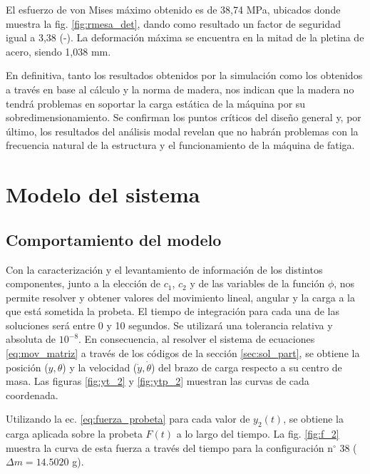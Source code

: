 El esfuerzo de von Mises máximo obtenido es de 38,74 MPa, ubicados donde muestra la fig. \ref{fig:rmesa_det}, dando como resultado un factor de seguridad igual a 3,38 (-). La deformación máxima se encuentra en la mitad de la pletina de acero, siendo 1,038 mm.

En definitiva, tanto los resultados obtenidos por la simulación como los obtenidos a través en base al cálculo y la norma de madera, nos indican que la madera no tendrá problemas en soportar la carga estática de la máquina por su sobredimensionamiento. Se confirman los puntos críticos del diseño general y, por último, los resultados del análisis modal revelan que no habrán problemas con la frecuencia natural de la estructura y el funcionamiento de la máquina de fatiga.

\section{Modelo del sistema}

\subsection{Comportamiento del modelo}
Con la caracterización y el levantamiento de información de los distintos componentes, junto a la elección de $c_1$, $c_2$ y de las variables de la función $\phi$, nos permite resolver y obtener valores del movimiento lineal, angular y la carga a la que está sometida la probeta. El tiempo de integración para cada una de las soluciones será entre 0 y 10 segundos. Se utilizará una tolerancia relativa y absoluta de $10^{-8}$. En consecuencia, al resolver el sistema de ecuaciones \ref{eq:mov_matriz} a través de los códigos de la sección \ref{sec:sol_part}, se obtiene la posición ($y,\theta$) y la velocidad ($\dot{y},\dot{\theta}$) del brazo de carga respecto a su centro de masa. Las figuras \ref{fig:yt_2} y \ref{fig:ytp_2} muestran las curvas de cada coordenada.

Utilizando la ec. \ref{eq:fuerza_probeta} para cada valor de $y_2(t)$, se obtiene la carga aplicada sobre la probeta $F(t)$ a lo largo del tiempo. La fig. \ref{fig:f_2} muestra la curva de esta fuerza a través del tiempo para la configuración n$^{\circ}$ 38 ($\Delta m = 14.5020$ g).

